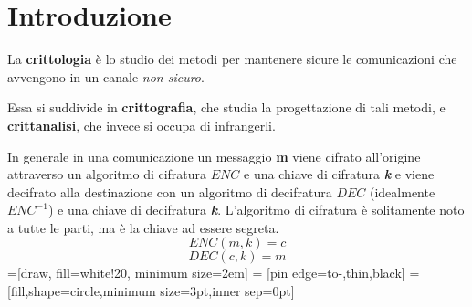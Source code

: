 \documentclass[a4paper]{report}
\begin{document}
\maketitle
\tableofcontents

\chapter{Introduzione}
La \textbf{crittologia} è lo studio dei metodi per mantenere sicure le comunicazioni che avvengono in un canale \textit{non sicuro}.

Essa si suddivide in \textbf{crittografia}, che studia la progettazione di tali metodi, e \textbf{crittanalisi}, che invece si occupa di infrangerli.
\begin{center}
\end{center}
In generale in una comunicazione un messaggio \textbf{m} viene cifrato all'origine attraverso un algoritmo di cifratura \textbf{\(ENC\)} e una chiave di cifratura \textbf{\textit{k}} e viene decifrato alla destinazione con un algoritmo di decifratura \textbf{\(DEC\)} (idealmente \(ENC^{-1}\)) e una chiave di decifratura \textbf{\textit{k}}. L'algoritmo di cifratura è solitamente noto a tutte le parti, ma è la chiave ad essere segreta.
$$ENC(m,k)=c$$
$$DEC(c,k)=m$$
=[draw, fill=white!20, minimum size=2em]
 = [pin edge={to-,thin,black}]
=[fill,shape=circle,minimum size=3pt,inner sep=0pt]
\begin{center}
\end{center}
\end{document}
